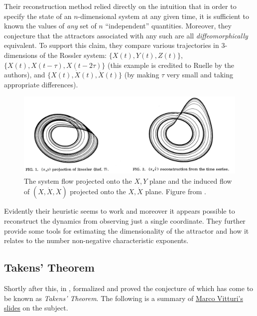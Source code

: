 \documentclass[12pt]{article}
\theoremstyle{definition}
\theoremstyle{remark}
\newcommand{\speccite}[1]{\citetitle{#1} \parencite{#1}}
\begin{document}
Their reconstruction method relied directly on the intuition that in order to specify the state of an $n$-dimensional system at any given time, it is sufficient to known the values of \textit{any} set of $n$ ``independent'' quantities. Moreover, they conjecture that the attractors associated with any such are all \textit{diffeomorphically} equivalent. To support this claim, they compare various trajectories in $3$-dimensions of the Rossler system: $\{ X(t), Y(t), Z(t)\}$, $\{ X(t), X(t - \tau), X(t - 2 \tau)\}$ (this example is credited to Ruelle by the authors), and $\{ X(t), \dot X(t), \ddot X(t) \}$ (by making $\tau$ very small and taking appropriate differences).

\begin{figure}[H]
    \centering
    \includegraphics[scale=0.25]{figures/rossler_reconstruction.png}
    \caption{The \citeauthor{rossler1976equation} system flow projected onto the $X, Y$ plane and the induced flow of $(X, \dot X, \ddot X)$ projected onto the $X, \dot X$ plane. Figure from \parencite{packard1980geometry}.}
\end{figure}

Evidently their heuristic seems to work and moreover it appears possible to reconstruct the dynamics from observing just a single coordinate. They further provide some tools for estimating the dimensionality of the attractor and how it relates to the number non-negative characteristic exponents.

\subsection{Takens' Theorem}

Shortly after this, in \speccite{takens1981detecting}, \citeauthor{takens1981detecting} formalized and proved the conjecture of \parencite{packard1980geometry} which has come to be known as \textit{Takens' Theorem}. The following is a summary of \href{https://www.math.sciences.univ-nantes.fr/~vitturi/talks/PG%20Colloquia/Takens_theorem.pdf}{Marco Vitturi's slides} on the subject.
\end{document}
